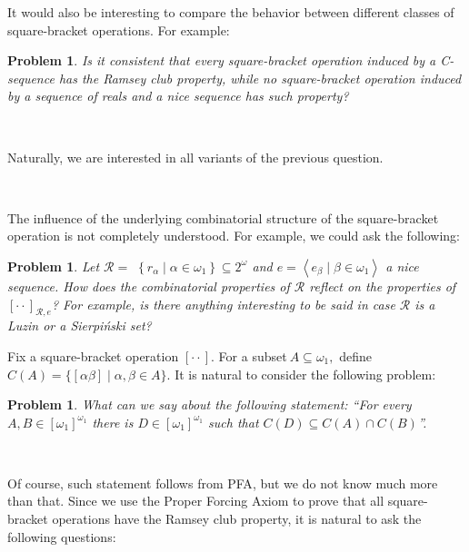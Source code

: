 \documentclass{article}
\newtheorem{problem}[theorem]{Problem}
\begin{document}
\qquad\qquad\qquad

It would also be interesting to compare the behavior between different classes
of square-bracket operations. For example:

\begin{problem}
Is it consistent that every square-bracket operation induced by a
\textsf{C}-sequence has the Ramsey club property, while no square-bracket
operation induced by a sequence of reals and a nice sequence has such property?
\end{problem}

\qquad\ \qquad\ \ 

Naturally, we are interested in all variants of the previous question.

\qquad\ \qquad\ \ \ \ \ \qquad\ \ \ 

The influence of the underlying combinatorial structure of the square-bracket
operation is not completely understood. For example, we could ask the following:

\begin{problem}
Let $\mathcal{R=}$ $\left\{  r_{\alpha}\mid\alpha\in\omega_{1}\right\}
\subseteq2^{\omega}$ and $e=\left\langle e_{\beta}\mid\beta\in\omega
_{1}\right\rangle $ a nice sequence. How does the combinatorial properties of
$\mathcal{R}$ reflect on the properties of $[\cdot\cdot]_{\mathcal{R},e}$? For
example, is there anything interesting to be said in case $\mathcal{R}$ is a
Luzin or a Sierpi\'{n}ski set?
\end{problem}

Fix a square-bracket operation $[\cdot\cdot]$. For a subset$\ A\subseteq
\omega_{1},$ define $C\left(  A\right)  =\{\left[  \alpha\beta\right]
\mid\alpha,\beta\in A\}.$ It is natural to consider the following problem:

\begin{problem}
What can we say about the following statement: \textquotedblleft For every
$A,B\in\left[  \omega_{1}\right]  ^{\omega_{1}}$ there is $D\in\left[
\omega_{1}\right]  ^{\omega_{1}}$ such that $C\left(  D\right)  \subseteq
C\left(  A\right)  \cap C\left(  B\right)  $\textquotedblright.
\end{problem}

\qquad\ \qquad\ \ 

Of course, such statement follows from \textsf{PFA}, but we do not know much
more than that. Since we use the Proper Forcing Axiom to prove that all
square-bracket operations have the Ramsey club property, it is natural to ask
the following questions:
\end{document}
